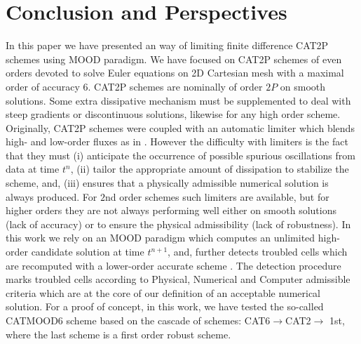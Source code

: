 \documentclass[3p,times]{elsarticle}
\begin{document}







\section{Conclusion and Perspectives} \label{sec:conclusion}
In this paper we have presented an \aposteriori way of 
limiting finite difference CAT2P schemes using MOOD paradigm.
We have focused on CAT2P schemes of even orders devoted to solve Euler equations on 2D Cartesian mesh with a maximal order of accuracy $6$.
CAT2P schemes are nominally of order $2P$ on smooth solutions. 
Some extra dissipative mechanism must be supplemented to deal with steep gradients or discontinuous solutions, likewise for any high order scheme.
Originally, CAT2P schemes were coupled with an automatic \apriori limiter which blends high- and low-order fluxes as in \cite{CPZMR2020}.
However the difficulty with \apriori limiters is the fact that they must (i) anticipate the occurrence of possible spurious oscillations from data at time $t^n$,
(ii) tailor the appropriate amount of dissipation to stabilize the scheme, and, (iii) ensures that a physically admissible numerical solution is always produced.
For $2$nd order schemes such \apriori limiters are available, but for higher orders they are not always performing well either on smooth solutions (lack of accuracy) or to ensure the physical admissibility (lack of robustness).
In this work we rely on an \aposteriori MOOD paradigm which computes an unlimited high-order candidate solution at time $t^{n+1}$, and, further detects troubled cells which are recomputed with a lower-order accurate scheme \cite{CDL2}.
The detection procedure marks troubled cells according to Physical, Numerical and Computer admissible criteria which are at the core of our definition of an acceptable numerical solution.
For a proof of concept, in this work, we have tested the so-called CATMOOD6 scheme based on the cascade of schemes: CAT6$\rightarrow$CAT2$\rightarrow$ 1st, where the last scheme is a first order robust scheme.  \\
\end{document}

